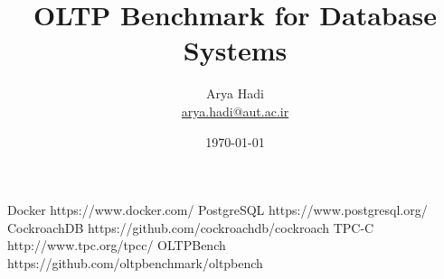 \documentclass[letterpaper,12pt]{article}
\begin{document}
\title{OLTP Benchmark for Database Systems}
\author{Arya Hadi \\ \href{mailto:arya.hadi@aut.ac.ir}{arya.hadi@aut.ac.ir}}
\date{\today}
\maketitle






\begin{thebibliography}{9}
    Docker https://www.docker.com/
    PostgreSQL https://www.postgresql.org/
    CockroachDB https://github.com/cockroachdb/cockroach
    TPC-C http://www.tpc.org/tpcc/
    OLTPBench https://github.com/oltpbenchmark/oltpbench
\end{thebibliography}
\end{document}
